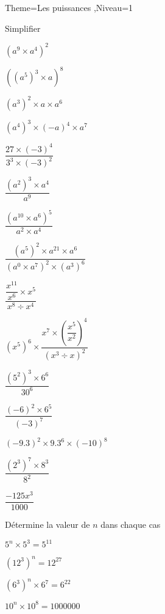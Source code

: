 \documentclass[a4paper,12pt]{article}
\begin{document}
\begin{Maquette}[Fiche]{Theme=Les puissances ,Niveau=1}
\begin{exercice}
Simplifier 

\begin{itemize*}
\item[] $(a^{9}\times a^{4})^{2}$ 
\item  $((a^{5})^{3}\times a)^{8}$ 
\item $(a^{3})^{2}\times a \times a^{6}$ 
\item $(a^{4})^{3}\times (-a)^{4}\times a^{7}$
\end{itemize*}\vspace{0.5cm}

\begin{itemize*}
\item[] $\dfrac{27\times (-3)^{4}}{3^{3}\times (-3)^{2}}$ 
\item $\dfrac{(a^{2})^{3}\times a^{4}}{a^{9}}$ 
\item $\dfrac{(a^{10}\times a^{6})^{5}}{a^{2}\times a^{4}}$
\item $\dfrac{(a^{5})^{2}\times a^{21}\times a^{6}}{(a^{0}\times a^{7})^{2}\times (a^{3})^{6}}$
\end{itemize*}\vspace{0.5cm}

\begin{itemize*}
\item[] $\dfrac{\dfrac{x^{11}}{x^{6}}\times x^{5}}{x^{8}\div x^{4}}$ 
\item $(x^{5})^{6}\times \dfrac{x^{7}\times (\dfrac{x^{5}}{x^{2}})^{4}}{(x^{3}\div x)^{2}} $
\item $\dfrac{(5^{2})^{3}\times 6^{6}}{30^{6}}$ 
\item $\dfrac{(-6)^{2}\times 6^{5}}{(-3)^{7}}$ 
\end{itemize*}\vspace{0.5cm}

\begin{itemize*}
\item[] $(-9.3)^{2}\times 9.3^{6}\times (-10)^{8}$ 
\item $\dfrac{(2^{3})^{7}\times 8^{3}}{8^{2}}$ 
\item $\dfrac{-125x^{3}}{1000}$
\end{itemize*}
\end{exercice}

\begin{exercice}
Détermine la valeur de $n$ dans chaque cas

\begin{itemize*}
\item[] $5^{n}\times 5^{3}=5^{11}$  
\item $(12^{3})^{n}=12^{27}$  
\item $(6^{3})^{n}\times 6^{7}=6^{22}$ 
\item $10^{n}\times 10^{8}=1000000$ 
\end{itemize*}\vspace{0.5cm}


\end{exercice}
\end{Maquette}
\end{document}
